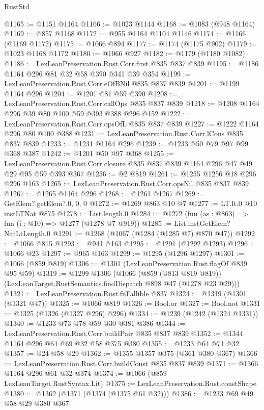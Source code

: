\begin{lexlean}{RustStd}
\begin{coremodule}
@1165 := @1151 @1164
@1166 := @1023 @1144
@1168 := @1083 (@948 @1164)
@1169 := @857 @1168
@1172 := @955 @1164 @1104 @1146
@1174 := @1166 (@1169 @1172)
@1175 := @1066 @894
@1177 := @1174 (@1175 @902)
@1179 := @1023 @1168 @1172
@1180 := @1066 @927
@1182 := @1179 (@1180 @1082)
@1186 := LexLeanPreservation.Rust.Corr.first @835 @837 @839
@1195 := @1186 @1164 @296 @81 @32 @58 @390 @341 @39 @354
@1199 := LexLeanPreservation.Rust.Corr.eOfBNil @835 @837 @839
@1201 := @1199 @1164 @296
@1204 := @1201 @81 @59 @390
@1208 := LexLeanPreservation.Rust.Corr.callOps @835 @837 @839
@1218 := @1208 @1164 @296 @39 @80 @100 @59 @393 @388 @296 @152
@1222 := LexLeanPreservation.Rust.Corr.opsOfL @835 @837 @839
@1227 := @1222 @1164 @296 @80 @100 @388
@1231 := LexLeanPreservation.Rust.Corr.lCons @835 @837 @839
@1233 := @1231 @1164 @296
@1239 := @1233 @50 @79 @97 @99 @368 @387
@1242 := @1201 @50 @97 @368
@1255 := LexLeanPreservation.Rust.Corr.closure
    @835
    @837
    @839
    @1164
    @296
    @47
    @49
    @29
    @95
    @59
    @393
    @367
@1256 := @2 @819
@1261 := @1255 @1256 @18 @296 @296 @163
@1265 := LexLeanPreservation.Rust.Corr.opsNil @835 @837 @839
@1267 := @1265 @1164 @296
@1268 := @1261 @1267
@1269 := GetElem?.getElem?.{0, 0, 0}
@1272 := @1269 @863 @10 @7
@1277 := LT.lt.{0} @10 instLTNat @875
@1278 := List.length.{0}
@1284 := @1272 (fun (as : @863) => fun (i : @10) => @1277 (@1278 @7 @919))
@1285 := List.instGetElem?NatLtLength.{0}
@1291 := @1268 (@1067 (@1284 (@1285 @7) @870 @47))
@1292 := @1066 @815
@1293 := @941 @163
@1295 := @1291 (@1292 @1293)
@1296 := @1066 @23
@1297 := @965 @163
@1299 := @1295 (@1296 @1297)
@1301 := @1066 (@859 @819)
@1306 := @1301 (LexLeanPreservation.Rust.flagOf @839 @95 @59)
@1319 := @1299
    @1306
    (@1066
      (@859 (@813 @819 @819))
      (LexLeanTarget.RustSemantics.findDispatch @898 @47 (@1278 @23 @29)))
@1321 := LexLeanPreservation.Rust.fnFallible @837
@1324 := @1319 (@1301 (@1321 @47))
@1325 := @1066 @819
@1326 := Bool.or
@1327 := Bool.not
@1331 := @1325 (@1326 (@1327 @296) @296)
@1334 := @1239 (@1242 (@1324 @1331))
@1340 := @1233 @73 @78 @59 @30 @381 @386
@1344 := LexLeanPreservation.Rust.Corr.buildPair @835 @837 @839
@1352 := @1344 @1164 @296 @64 @69 @32 @58 @375 @380
@1355 := @1233 @64 @71 @32
@1357 := @24 @58 @29
@1362 := @1355 @1357 @375 (@361 @380 @367)
@1366 := LexLeanPreservation.Rust.Corr.buildConst @835 @837 @839
@1371 := @1366 @1164 @296 @61 @32 @374
@1374 := @1066 (@859 LexLeanTarget.RustSyntax.Lit)
@1375 := LexLeanPreservation.Rust.constShape
@1380 := @1362 (@1371 (@1374 (@1375 @61 @32)))
@1386 := @1233 @69 @49 @58 @29 @380 @367

\end{coremodule}
\end{lexlean}

